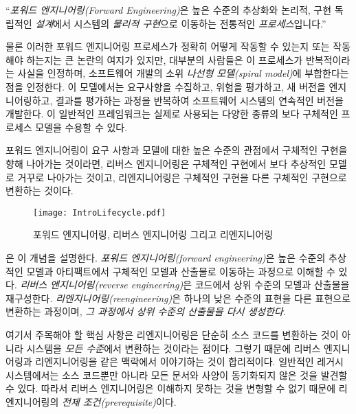 \documentclass[a4paper,10pt,twoside]{book}
\begin{document}
``\emph{포워드 엔지니어링(Forward Engineering)}은 높은 수준의 추상화와 논리적, 구현 독립적인 \emph{설계}에서 시스템의 \emph{물리적 구현}으로 이동하는 전통적인 \emph{프로세스}입니다.''

물론 이러한 포워드 엔지니어링 프로세스가 정확히 어떻게 작동할 수 있는지 또는 작동해야 하는지는 큰 논란의 여지가 있지만, 대부분의 사람들은 이 프로세스가 반복적이라는 사실을 인정하며, 소프트웨어 개발의 소위 \emph{나선형 모델(spiral model)}\cite{Boeh88a}에 부합한다는 점을 인정한다. 이 모델에서는 요구사항을 수집하고, 위험을 평가하고, 새 버전을 엔지니어링하고, 결과를 평가하는 과정을 반복하여 소프트웨어 시스템의 연속적인 버전을 개발한다. 이 일반적인 프레임워크는 실제로 사용되는 다양한 종류의 보다 구체적인 프로세스 모델을 수용할 수 있다.

포워드 엔지니어링이 요구 사항과 모델에 대한 높은 수준의 관점에서 구체적인 구현을 향해 나아가는 것이라면, 리버스 엔지니어링은 구체적인 구현에서 보다 추상적인 모델로 거꾸로 나아가는 것이고, 리엔지니어링은 구체적인 구현을 다른 구체적인 구현으로 변환하는 것이다.

\begin{figure}
\begin{center}
\texttt{[image: IntroLifecycle.pdf]}
\caption{포워드 엔지니어링, 리버스 엔지니어링 그리고 리엔지니어링}
\end{center}
\end{figure}

은 이 개념을 설명한다. \emph{포워드 엔지니어링(forward engineering)}은 높은 수준의 추상적인 모델과 아티팩트에서 구체적인 모델과 산출물로 이동하는 과정으로 이해할 수 있다. \emph{리버스 엔지니어링(reverse engineering)}은 코드에서 상위 수준의 모델과 산출물을 재구성한다. \emph{리엔지니어링(reengineering)}은 하나의 낮은 수준의 표현을 다른 표현으로 변환하는 과정이며, \emph{그 과정에서 상위 수준의 산출물을 다시 생성한다}. 

여기서 주목해야 할 핵심 사항은 리엔지니어링은 단순히 소스 코드를 변환하는 것이 아니라 시스템을 \emph{모든 수준}에서 변환하는 것이라는 점이다. 그렇기 때문에 리버스 엔지니어링과 리엔지니어링을 같은 맥락에서 이야기하는 것이 합리적이다. 일반적인 레거시 시스템에서는 소스 코드뿐만 아니라 모든 문서와 사양이 동기화되지 않은 것을 발견할 수 있다. 따라서 리버스 엔지니어링은 이해하지 못하는 것을 변형할 수 없기 때문에 리엔지니어링의 \emph{전제 조건(prerequisite)}이다.

\end{document}
